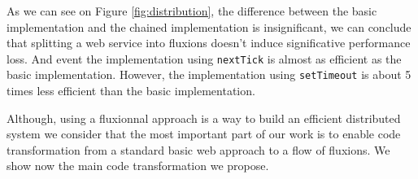 As we can see on Figure \ref{fig:distribution}, the difference between the basic implementation and the chained implementation is insignificant, we can conclude that splitting a web service into fluxions doesn't induce significative performance loss.
And event the implementation using \texttt{nextTick} is almost as efficient as the basic implementation.
However, the implementation using \texttt{setTimeout} is about 5 times less efficient than the basic implementation.

\TODO{}
Although, using a fluxionnal approach is a way to build an efficient distributed system we consider that the most important part of our work is to enable code transformation from a standard basic web approach to a flow of fluxions.
We show now the main code transformation we propose.
